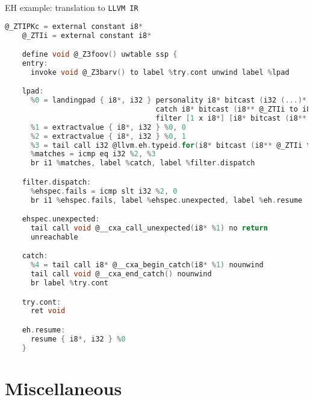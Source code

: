 \documentclass[8pt]{beamer}
\begin{document}
\begin{frame}[fragile]{EH example: translation to \texttt{LLVM IR}}
  \begin{lstlisting}[language=C,basicstyle=\tiny\ttfamily]
    @_ZTIPKc = external constant i8*
    @_ZTIi = external constant i8*

    define void @_Z3foov() uwtable ssp {
    entry:
      invoke void @_Z3barv() to label %try.cont unwind label %lpad

    lpad:
      %0 = landingpad { i8*, i32 } personality i8* bitcast (i32 (...)* @__gxx_personality_v0 to i8*)
                                   catch i8* bitcast (i8** @_ZTIi to i8*)
                                   filter [1 x i8*] [i8* bitcast (i8** @_ZTIPKc to i8*)]
      %1 = extractvalue { i8*, i32 } %0, 0
      %2 = extractvalue { i8*, i32 } %0, 1
      %3 = tail call i32 @llvm.eh.typeid.for(i8* bitcast (i8** @_ZTIi to i8*)) nounwind
      %matches = icmp eq i32 %2, %3
      br i1 %matches, label %catch, label %filter.dispatch

    filter.dispatch:
      %ehspec.fails = icmp slt i32 %2, 0
      br i1 %ehspec.fails, label %ehspec.unexpected, label %eh.resume

    ehspec.unexpected:
      tail call void @__cxa_call_unexpected(i8* %1) no return
      unreachable

    catch:
      %4 = tail call i8* @__cxa_begin_catch(i8* %1) nounwind
      tail call void @__cxa_end_catch() nounwind
      br label %try.cont

    try.cont:
      ret void

    eh.resume:
      resume { i8*, i32 } %0
    }
  \end{lstlisting}
\end{frame}

\section[Miscellaneous]{Miscellaneous}
\subsection*{}
\end{document}
